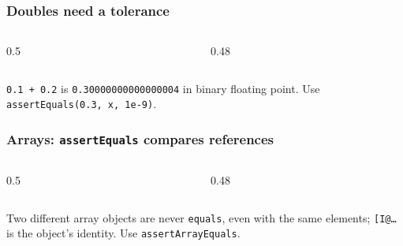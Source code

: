 \documentclass[aspectratio=169,10pt,compress]{beamer}
\begin{document}
\begin{frame}[t,fragile] \frametitle{Doubles need a tolerance}
  \begin{columns}[T]
    \begin{column}{0.5\textwidth}
    \end{column}
    \begin{column}{0.48\textwidth}
    \end{column}
  \end{columns}

  \vspace{0.2em}
  \small \texttt{0.1 + 0.2} is \texttt{0.30000000000000004} in binary floating point. Use \texttt{assertEquals(0.3, x, 1e-9)}.
\end{frame}




\begin{frame}[t,fragile] \frametitle{Arrays: \texttt{assertEquals} compares references}
  \begin{columns}[T]
    \begin{column}{0.5\textwidth}
    \end{column}
    \begin{column}{0.48\textwidth}
    \end{column}
  \end{columns}

  \vspace{0.2em}
  \small Two different array objects are never \texttt{equals}, even with the same elements; \texttt{[I@\dots} is
  the object's identity. Use \texttt{assertArrayEquals}.
\end{frame}
\end{document}
